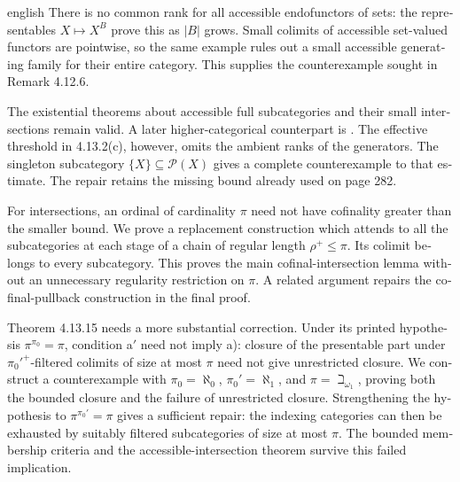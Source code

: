 \begin{otherlanguage}{english}
\begin{otherlanguage*}{english}
There is no common rank for all accessible endofunctors of sets: the representables $X\mapsto X^B$ prove this as $|B|$ grows. Small colimits of accessible set-valued functors are pointwise, so the same example rules out a small accessible generating family for their entire category. This supplies the counterexample sought in Remark 4.12.6.

The existential theorems about accessible full subcategories and their small intersections remain valid. A later higher-categorical counterpart is \citet[Proposition 5.4.7.10]{Lurie2009HTT}. The effective threshold in 4.13.2(c), however, omits the ambient ranks of the generators. The singleton subcategory $\{X\}\subseteq\mathcal P(X)$ gives a complete counterexample to that estimate. The repair retains the missing bound already used on page 282.

For intersections, an ordinal of cardinality $\pi$ need not have cofinality greater than the smaller bound. We prove a replacement construction which attends to all the subcategories at each stage of a chain of regular length $\rho^+\leq\pi$. Its colimit belongs to every subcategory. This proves the main cofinal-intersection lemma without an unnecessary regularity restriction on $\pi$. A related argument repairs the cofinal-pullback construction in the final proof.

Theorem 4.13.15 needs a more substantial correction. Under its printed hypothesis $\pi^{\pi_0}=\pi$, condition a$'$ need not imply a): closure of the presentable part under $\pi_0'^+$-filtered colimits of size at most $\pi$ need not give unrestricted closure. We construct a counterexample with $\pi_0=\aleph_0$, $\pi_0'=\aleph_1$, and $\pi=\beth_{\omega_1}$, proving both the bounded closure and the failure of unrestricted closure. Strengthening the hypothesis to $\pi^{\pi_0'}=\pi$ gives a sufficient repair: the indexing categories can then be exhausted by suitably filtered subcategories of size at most $\pi$. The bounded membership criteria and the accessible-intersection theorem survive this failed implication.

\end{otherlanguage*}
\end{otherlanguage}
\dgrchunkend
